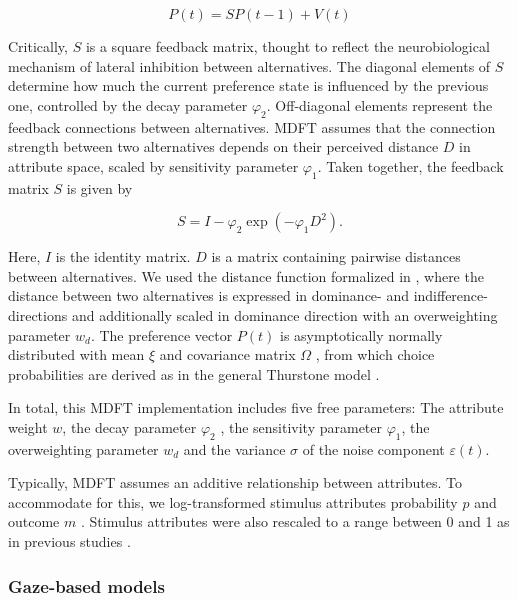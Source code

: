 \documentclass[11pt, a4paper]{article}
\begin{document}
\begin{equation}
    \label{eq:mdft:p}
    P(t) = SP(t - 1) + V(t)
\end{equation}

Critically, $S$ is a square feedback matrix, thought to reflect the neurobiological mechanism of lateral inhibition between alternatives. The diagonal elements of $S$ determine how much the current preference state is influenced by the previous one, controlled by the decay parameter $\varphi_2$. Off-diagonal elements represent the feedback connections between alternatives. MDFT assumes that the connection strength between two alternatives depends on their perceived distance $D$ in attribute space, scaled by sensitivity parameter $\varphi_1$. Taken together, the feedback matrix $S$ is given by

\begin{equation}
    \label{eq:mdft:s}
    S = I - \varphi_2 \exp{(-\varphi_1 D^2)}.
\end{equation}

Here, $I$ is the identity matrix. $D$ is a matrix containing pairwise distances between alternatives. We used the distance function formalized in \citeauthor{hotaling2010TheoreticalDevelopmentsDecision} \autocite{hotaling2010TheoreticalDevelopmentsDecision}, where the distance between two alternatives is expressed in dominance- and indifference-directions and additionally scaled in dominance direction with an overweighting parameter $w_d$. The preference vector $P(t)$ is asymptotically normally distributed with mean $\xi$ and covariance matrix $\Omega$ \autocite{busemeyer2002SurveyDecisionField}, from which choice probabilities are derived as in the general Thurstone model \autocite{bockenholt1992MultivariateModelsPreference}.

In total, this MDFT implementation includes five free parameters: The attribute weight $w$, the decay parameter $\varphi_2$ , the sensitivity parameter $\varphi_1$, the overweighting parameter $w_d$ and the variance $\sigma$ of the noise component $\varepsilon(t)$.

Typically, MDFT assumes an additive relationship between attributes. To accommodate for this, we log-transformed stimulus attributes probability $p$ and outcome $m$ \autocite{mohr2017AttractionEffectRisky}. Stimulus attributes were also rescaled to a range between 0 and 1 as in previous studies \autocite{berkowitsch2014RigorouslyTestingMultialternative}.

\subsubsection*{Gaze-based models}
\end{document}
